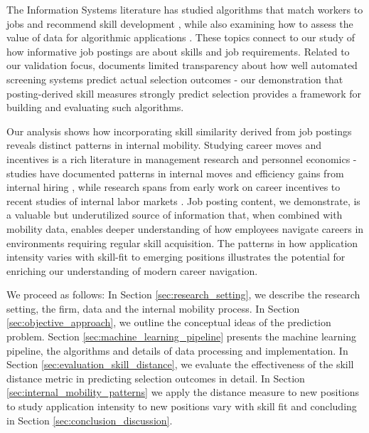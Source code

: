 The Information Systems literature has studied algorithms that match workers to jobs and recommend skill 
development \citep{kokkodis2021demand, kokkodis2023good}, while also examining how to assess the value of 
data for algorithmic applications \citep{lei2024value}. These topics connect to our study of how informative 
job postings are about skills and job requirements. Related to our validation focus, 
\citet{raghavan2020mitigating} documents limited transparency about how well automated screening 
systems predict actual selection outcomes - our demonstration that posting-derived skill measures 
strongly predict selection provides a framework for building and evaluating such algorithms.

Our analysis shows how incorporating skill similarity derived from job postings reveals distinct patterns 
in internal mobility. Studying career moves and incentives is a rich literature in management research and 
personnel economics - studies have documented patterns in internal moves \citep{bidwell2024stepping} and 
efficiency gains from internal hiring \citep{bidwell2011paying}, while research spans from early work on 
career incentives \citep{baker1994internal, baker1994wage} to recent studies of internal labor 
markets \citep{tambe2020paying, huitfeldt2023internal}. Job posting content, we demonstrate, is a 
valuable but underutilized source of information that, when combined with mobility data, enables deeper 
understanding of how employees navigate careers in environments requiring regular skill acquisition. The 
patterns in how application intensity varies with skill-fit to emerging positions illustrates the potential 
for enriching our understanding of modern career navigation.

We proceed as follows: In Section \ref{sec:research_setting}, we describe the research setting, the 
firm, data and the internal mobility process. In Section \ref{sec:objective_approach}, we outline 
the conceptual ideas of the prediction problem. Section \ref{sec:machine_learning_pipeline} presents 
the machine learning pipeline, the algorithms and details of data processing and implementation. In 
Section \ref{sec:evaluation_skill_distance}, we evaluate the effectiveness of the skill distance metric 
in predicting selection outcomes in detail. In Section \ref{sec:internal_mobility_patterns} we apply 
the distance measure to new positions to study application intensity to new positions vary with skill 
fit and concluding in Section \ref{sec:conclusion_discussion}.

